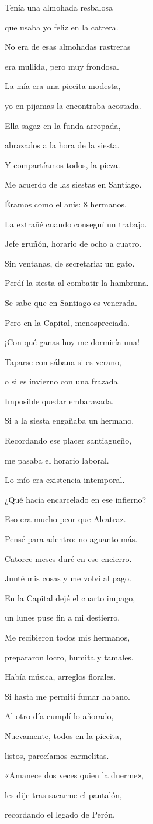 \documentclass[11pt,twoside,openright,a5paper]{book}
\begin{document}
\begin{center}
Tenía una almohada resbalosa

que usaba yo feliz en la catrera.

No era de esas almohadas rastreras

era mullida, pero muy frondosa.


La mía era una piecita modesta,

yo en pijamas la encontraba acostada.

Ella sagaz en la funda arropada,

abrazados a la hora de  la siesta.


Y compartíamos todos, la pieza.

Me acuerdo de las siestas en Santiago.

Éramos como el anís: 8 hermanos.


La extrañé cuando conseguí un trabajo.

Jefe gruñón, horario de ocho a cuatro.

Sin ventanas, de secretaria: un gato.


Perdí la siesta al combatir la hambruna.

Se sabe que en Santiago es venerada.

Pero en la Capital, menospreciada.

¡Con qué ganas hoy me dormiría una!


Taparse con sábana si es verano,

o si es invierno con una frazada.

Imposible quedar embarazada,

Si a la siesta engañaba un hermano.


Recordando ese placer santiagueño,

me pasaba el horario laboral.

Lo mío era existencia intemporal.


¿Qué hacía encarcelado en ese infierno?

Eso era mucho peor que Alcatraz.

Pensé para adentro: no aguanto más.


Catorce meses duré en ese encierro.

Junté mis cosas y me volví al pago.

En la Capital dejé el cuarto impago,

un lunes puse fin a mi destierro.


Me recibieron todos mis hermanos,

prepararon locro, humita y tamales.

Había música, arreglos florales.

Si hasta me permití fumar habano.


Al otro día cumplí lo añorado,

Nuevamente, todos en la piecita,

listos, parecíamos carmelitas.


«Amanece dos veces quien la duerme»,

les dije tras sacarme el pantalón,

recordando el legado de Perón.
\end{center}
\end{document}
